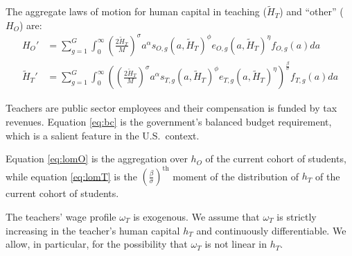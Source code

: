 \documentclass[onehalfspacing,11pt]{article}
\begin{document}
The aggregate laws of motion for human capital in teaching ($\widetilde{H}_T$) and ``other'' (${H}_O$) are:
\begin{align}
\label{eq:lomO}
{H}_{O}' & = \sum_{g=1}^G \int_0^\infty \left(\tfrac{2 \widetilde{H}_T}{M}\right)^\sigma a^\alpha s_{O,g}\left(a,\widetilde{H}_T\right)^\phi e_{O,g}(a,\widetilde{H}_T)^\eta  f_{O,g}(a) da \\
\label{eq:lomT}
\widetilde{H}_{T}' & = \sum_{g=1}^G \int_0^\infty \left(\left(\tfrac{2 \widetilde{H}_T}{M}\right)^\sigma a^\alpha s_{T,g}\left(a,\widetilde{H}_T\right)^\phi e_{T,g}(a,\widetilde{H}_T)^\eta \right)^{\frac{\beta}{\sigma}} f_{T,g}(a) da 
\end{align}
 
Teachers are public sector employees and their compensation is funded by tax revenues. Equation \eqref{eq:bc} is the government's balanced budget requirement, which is a salient feature in the U.S.~context. 

Equation \eqref{eq:lomO} is the aggregation over $h_O$ of the current cohort of students, while equation \eqref{eq:lomT} is the ${\left( \tfrac{\beta}{\sigma} \right)}^{\textrm{th}}$ moment of the distribution of $h_T$ of the current cohort of students.

The teachers' wage profile $\omega_T$ is exogenous. We assume that $\omega_T$ is strictly increasing in the teacher's human capital $h_T$ and continuously differentiable. We allow, in particular, for the possibility that $\omega_T$ is not linear in $h_T$.%
\end{document}
